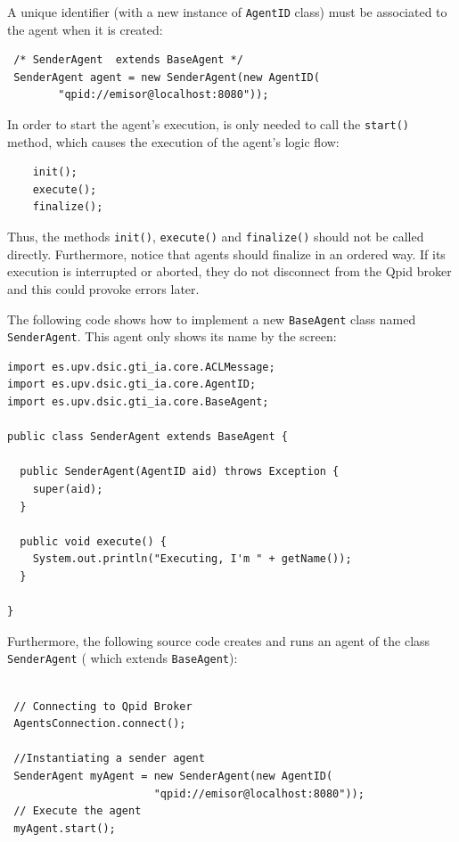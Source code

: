 A unique identifier (with a new instance of \lstinline|AgentID| class) must be associated to the agent when it is created: 
\begin{lstlisting}
 /* SenderAgent  extends BaseAgent */
 SenderAgent agent = new SenderAgent(new AgentID(
        "qpid://emisor@localhost:8080"));
\end{lstlisting}		

In order to start the agent's execution, is only needed to call the \lstinline|start()| method, which causes the execution of the agent's logic flow:
\begin{lstlisting}
	init();
	execute();
	finalize(); 
\end{lstlisting}	

Thus, the methods \lstinline|init()|, \lstinline|execute()| and  \lstinline|finalize()| should not be called directly. Furthermore, notice that agents should finalize in an ordered way. If its execution is interrupted or aborted, they do not disconnect from the Qpid broker and this could provoke errors later.

The following code shows how to implement a new \lstinline|BaseAgent| class named \lstinline|SenderAgent|. This agent only shows its name by the screen:

\begin{lstlisting}
import es.upv.dsic.gti_ia.core.ACLMessage;
import es.upv.dsic.gti_ia.core.AgentID;
import es.upv.dsic.gti_ia.core.BaseAgent;

public class SenderAgent extends BaseAgent {

  public SenderAgent(AgentID aid) throws Exception {
	super(aid);
  }

  public void execute() {
	System.out.println("Executing, I'm " + getName());
  }

}
\end{lstlisting}

Furthermore, the following source code creates and runs an agent of the class \lstinline|SenderAgent| ( which extends \lstinline|BaseAgent|):
\begin{lstlisting}

 // Connecting to Qpid Broker
 AgentsConnection.connect();

 //Instantiating a sender agent
 SenderAgent myAgent = new SenderAgent(new AgentID(
                       "qpid://emisor@localhost:8080"));
 // Execute the agent
 myAgent.start();

\end{lstlisting}

